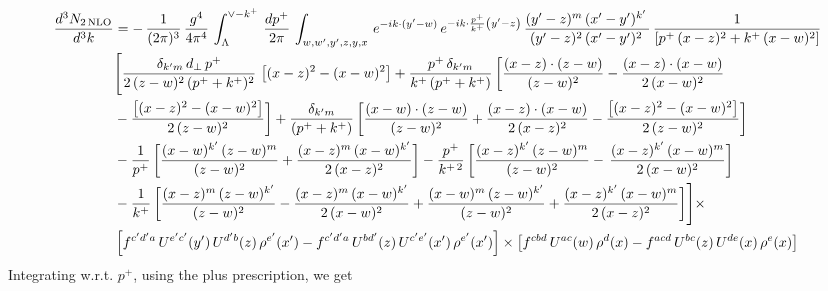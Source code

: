 \documentclass[9pt]{article}
\numberwithin{equation}{section}
\begin{document}
\begin{align}
 \frac{d^{3}N_{2\,\rm NLO}}{d^{3}k} & = -\, \frac{1}{(2\pi)^{3}}\,\frac{g^{4}}{4\pi^{4}}\,\int_{\Lambda}^{\vee-k^{+}}\, \frac{dp^{+}}{2\pi}\,\int_{w,w',y',z,y,x}\, e^{-ik\cdot (y'-w)}\,e^{-ik\cdot \frac{p^{+}}{k^{+}}\left(y'-z\right)}\, \frac{(y'-z)^{m}\,(x'-y')^{k'}\,}{(y'-z)^{2}\,(x'-y')^{2}\,}\, \frac{1}{\left[p^{+}\,(x-z)^{2}+k^{+}\,(x-w)^{2}\right]}\notag \\ & \Bigg[\frac{\delta_{k'm}\,d_{\perp}\,p^{+}}{2\,(z-w)^{2}\,(p^{+}+k^{+})^{2}}\, \left[(x-z)^{2}-(x-w)^{2}\right]+\frac{p^{+}\,\delta_{k'm}}{k^{+}\,(p^{+}+k^{+})}\,\bigg[\frac{(x-z)\cdot (z-w)}{(z-w)^{2}} -\frac{(x-z)\cdot (x-w)}{2\,(x-w)^{2}}\notag \\ & -\frac{\left[(x-z)^{2}-(x-w)^{2}\right]}{2\,(z-w)^{2}}\bigg] +\frac{\delta_{k'm}}{(p^{+}+k^{+})}\,\bigg[\frac{(x-w)\cdot (z-w)}{(z-w)^{2}}+\frac{(x-z)\cdot (x-w)}{2\,(x-z)^{2}} -\frac{\left[(x-z)^{2}-(x-w)^{2}\right]}{2\,(z-w)^{2}}\bigg]\notag \\ & -\frac{1}{p^{+}}\,\bigg[\frac{(x-w)^{k'}\,(z-w)^{m}}{(z-w)^{2}}+\frac{(x-z)^{m}\,(x-w)^{k'}}{2\,(x-z)^{2}}\bigg]-\frac{p^{+}}{k^{+\,2}}\,\bigg[\frac{(x-z)^{k'}\,(z-w)^{m}}{(z-w)^{2}} -\,\frac{(x-z)^{k'}\,(x-w)^{m}}{2\,(x-w)^{2}}\bigg]\notag \\ & -\frac{1}{k^{+}}\,\bigg[\frac{(x-z)^{m}\,(z-w)^{k'}}{(z-w)^{2}}-\frac{(x-z)^{m}\,(x-w)^{k'}}{2\,(x-w)^{2}}+\frac{(x-w)^{m}\,(z-w)^{k'}}{(z-w)^{2}} +\frac{(x-z)^{k'}\,(x-w)^{m}}{2\,(x-z)^{2}}\bigg]\Bigg]\times\,\notag \\ & \left[f^{c'd'a}\,U^{e'c'}(y')\,U^{d'b}(z)\,\rho^{e'}(x')-f^{c'd'a}\, 
    U^{bd'}(z)\,U^{c'e'}(x')\,\rho^{e'}(x')\right]\times \left[f^{cbd}\,U^{ac}(w)\,\rho^{d}(x) -f^{acd}\,U^{bc}(z)\,U^{de}(x)\,\rho^{e}(x)\right]
\end{align}
Integrating w.r.t. $p^{+}$, using the plus prescription, we get
\end{document}
